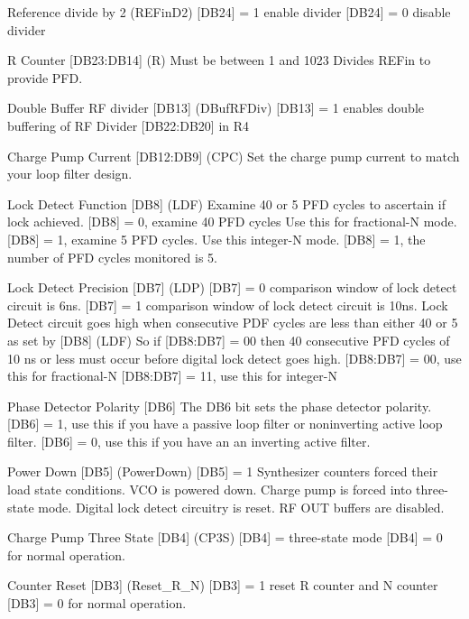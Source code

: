 Reference divide by 2 (R\+E\+Fin\+D2) \mbox{[}D\+B24\mbox{]} = 1 enable divider \mbox{[}D\+B24\mbox{]} = 0 disable divider

R Counter \mbox{[}D\+B23\+:D\+B14\mbox{]} (R) Must be between 1 and 1023 Divides R\+E\+Fin to provide P\+FD.

Double Buffer RF divider \mbox{[}D\+B13\mbox{]} (D\+Buf\+R\+F\+Div) \mbox{[}D\+B13\mbox{]} = 1 enables double buffering of RF Divider \mbox{[}D\+B22\+:D\+B20\mbox{]} in R4

Charge Pump Current \mbox{[}D\+B12\+:D\+B9\mbox{]} (C\+PC) Set the charge pump current to match your loop filter design.

Lock Detect Function \mbox{[}D\+B8\mbox{]} (L\+DF) Examine 40 or 5 P\+FD cycles to ascertain if lock achieved. \mbox{[}D\+B8\mbox{]} = 0, examine 40 P\+FD cycles Use this for fractional-\/N mode. \mbox{[}D\+B8\mbox{]} = 1, examine 5 P\+FD cycles. Use this integer-\/N mode. \mbox{[}D\+B8\mbox{]} = 1, the number of P\+FD cycles monitored is 5.

Lock Detect Precision \mbox{[}D\+B7\mbox{]} (L\+DP) \mbox{[}D\+B7\mbox{]} = 0 comparison window of lock detect circuit is 6ns. \mbox{[}D\+B7\mbox{]} = 1 comparison window of lock detect circuit is 10ns. Lock Detect circuit goes high when consecutive P\+DF cycles are less than either 40 or 5 as set by \mbox{[}D\+B8\mbox{]} (L\+DF) So if \mbox{[}D\+B8\+:D\+B7\mbox{]} = 00 then 40 consecutive P\+FD cycles of 10 ns or less must occur before digital lock detect goes high. \mbox{[}D\+B8\+:D\+B7\mbox{]} = 00, use this for fractional-\/N \mbox{[}D\+B8\+:D\+B7\mbox{]} = 11, use this for integer-\/N

Phase Detector Polarity \mbox{[}D\+B6\mbox{]} The D\+B6 bit sets the phase detector polarity. \mbox{[}D\+B6\mbox{]} = 1, use this if you have a passive loop filter or noninverting active loop filter. \mbox{[}D\+B6\mbox{]} = 0, use this if you have an an inverting active filter.

Power Down \mbox{[}D\+B5\mbox{]} (Power\+Down) \mbox{[}D\+B5\mbox{]} = 1 Synthesizer counters forced their load state conditions. V\+CO is powered down. Charge pump is forced into three-\/state mode. Digital lock detect circuitry is reset. RF O\+UT buffers are disabled.

Charge Pump Three State \mbox{[}D\+B4\mbox{]} (C\+P3S) \mbox{[}D\+B4\mbox{]} = three-\/state mode \mbox{[}D\+B4\mbox{]} = 0 for normal operation.

Counter Reset \mbox{[}D\+B3\mbox{]} (Reset\+\_\+\+R\+\_\+N) \mbox{[}D\+B3\mbox{]} = 1 reset R counter and N counter \mbox{[}D\+B3\mbox{]} = 0 for normal operation. 

